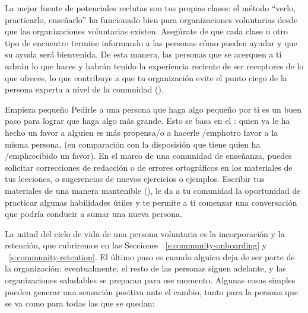 La mejor fuente de potenciales reclutas son tus propias clases:
el método ``verlo, practicarlo, enseñarlo'' ha funcionado bien para organizaciones voluntarias
desde que las organizaciones voluntarias existen.
Asegúrate de que cada clase u otro tipo de encuentro
termine informando a las personas cómo pueden ayudar y que su ayuda será bienvenida.
De esta manera, las personas que se acerquen a ti sabrán lo que haces
y habrán tenido la experiencia reciente de ser receptores de lo que ofreces,
lo que contribuye a que tu organización evite el punto ciego de la persona experta a nivel de la comunidad ().

\begin{aside}{Empieza pequeño}
  Pedirle a una persona que haga algo pequeño por ti
  es un buen paso para lograr que haga algo más grande. Esto se basa en el :
  quien ya le ha hecho un favor a alguien es más propensa/o
  a hacerle /emph{otro} favor a la misma persona,
  (en comparación con la disposisión que tiene quien ha /emph{recibido} un favor).
  En el marco de una comunidad de enseñanza, 
  puedes solicitar correcciones de redacción o de errores ortográficos en los materiales de tus lecciones,
  o sugerencias de nuevos ejercicios o ejemplos.
  Escribir tus materiales de una manera mantenible (),
  le da a tu comunidad la oportunidad de practicar algunas habilidades útiles
  y te permite a ti comenzar una conversación
  que podría conducir a sumar una nueva persona.
\end{aside}


La mitad del ciclo de vida de una persona voluntaria es la incorporación y la retención,
que cubriremos en las Secciones ~\ref{s:community-onboarding} y ~\ref{s:community-retention}.
El último paso es cuando alguien deja de ser parte de la organización:
eventualmente, el resto de las personas siguen adelante,
y las organizaciones saludables se preparan para ese momento.
Algunas cosas simples pueden generar una sensación positiva ante el cambio, tanto para la persona que se va como para todas las que se quedan:


